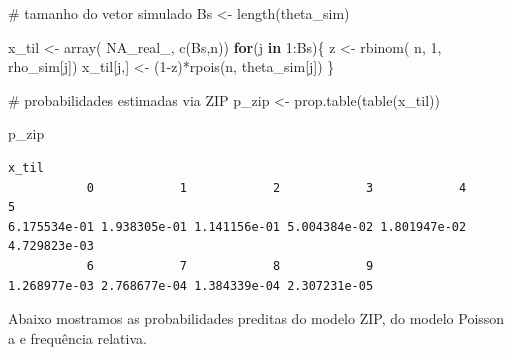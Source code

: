 \documentclass[
  letterpaper,
  DIV=11,
  numbers=noendperiod]{scrreprt}
\newenvironment{Shaded}{\begin{snugshade}}{\end{snugshade}}
\newcommand{\CommentTok}[1]{\textcolor[rgb]{0.37,0.37,0.37}{#1}}
\newcommand{\ConstantTok}[1]{\textcolor[rgb]{0.56,0.35,0.01}{#1}}
\newcommand{\ControlFlowTok}[1]{\textcolor[rgb]{0.00,0.23,0.31}{\textbf{#1}}}
\newcommand{\DecValTok}[1]{\textcolor[rgb]{0.68,0.00,0.00}{#1}}
\newcommand{\FunctionTok}[1]{\textcolor[rgb]{0.28,0.35,0.67}{#1}}
\newcommand{\NormalTok}[1]{\textcolor[rgb]{0.00,0.23,0.31}{#1}}
\newcommand{\OtherTok}[1]{\textcolor[rgb]{0.00,0.23,0.31}{#1}}
\newcommand{\SpecialCharTok}[1]{\textcolor[rgb]{0.37,0.37,0.37}{#1}}
\theoremstyle{definition}
\theoremstyle{plain}
\theoremstyle{definition}
\theoremstyle{remark}
\begin{document}
\begin{Shaded}
\begin{Highlighting}[]
\CommentTok{\# tamanho do vetor simulado}
\NormalTok{Bs }\OtherTok{\textless{}{-}} \FunctionTok{length}\NormalTok{(theta\_sim)}

\NormalTok{x\_til }\OtherTok{\textless{}{-}} \FunctionTok{array}\NormalTok{( }\ConstantTok{NA\_real\_}\NormalTok{, }\FunctionTok{c}\NormalTok{(Bs,n))}
\ControlFlowTok{for}\NormalTok{(j }\ControlFlowTok{in} \DecValTok{1}\SpecialCharTok{:}\NormalTok{Bs)\{}
\NormalTok{  z }\OtherTok{\textless{}{-}} \FunctionTok{rbinom}\NormalTok{( n, }\DecValTok{1}\NormalTok{, rho\_sim[j])}
\NormalTok{  x\_til[j,] }\OtherTok{\textless{}{-}}\NormalTok{ (}\DecValTok{1}\SpecialCharTok{{-}}\NormalTok{z)}\SpecialCharTok{*}\FunctionTok{rpois}\NormalTok{(n, theta\_sim[j])}
\NormalTok{\}}

\CommentTok{\# probabilidades estimadas via ZIP}
\NormalTok{p\_zip }\OtherTok{\textless{}{-}} \FunctionTok{prop.table}\NormalTok{(}\FunctionTok{table}\NormalTok{(x\_til))}

\NormalTok{p\_zip}
\end{Highlighting}
\end{Shaded}

\begin{verbatim}
x_til
           0            1            2            3            4            5 
6.175534e-01 1.938305e-01 1.141156e-01 5.004384e-02 1.801947e-02 4.729823e-03 
           6            7            8            9 
1.268977e-03 2.768677e-04 1.384339e-04 2.307231e-05 
\end{verbatim}

Abaixo mostramos as probabilidades preditas do modelo ZIP, do modelo
Poisson a e frequência relativa.
\end{document}
